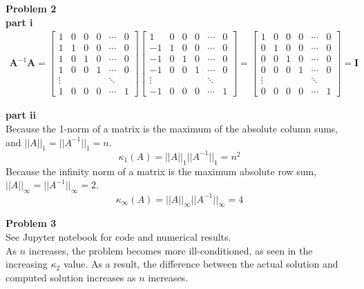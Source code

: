 \documentclass{article} %
\begin{document}
\textbf{Problem 2} \\
\textbf{part i}
\begin{align*}
\boldsymbol{A}^{-1}\boldsymbol{A} = \begin{bmatrix} 
1 & 0 & 0 & 0 & \cdots & 0 \\ 
1 & 1 & 0 & 0 & \cdots & 0 \\
1 & 0 & 1 & 0 & \cdots & 0 \\
1 & 0 & 0 & 1 & \cdots & 0 \\
\vdots &  & &  & \ddots &   \\ 
1 & 0 & 0 & 0 & \cdots & 1 
 \end{bmatrix}
\begin{bmatrix} 
1 & 0 & 0 & 0 & \cdots & 0 \\ 
-1 & 1 & 0 & 0 & \cdots & 0 \\
-1 & 0 & 1 & 0 & \cdots & 0 \\
-1 & 0 & 0 & 1 & \cdots & 0 \\
\vdots &  & &  & \ddots &   \\ 
-1 & 0 & 0 & 0 & \cdots & 1 
 \end{bmatrix}
 =
\begin{bmatrix} 
1 & 0 & 0 & 0 & \cdots & 0 \\ 
0 & 1 & 0 & 0 & \cdots & 0 \\
0 & 0 & 1 & 0 & \cdots & 0 \\
0 & 0 & 0 & 1 & \cdots & 0 \\
\vdots &  & &  & \ddots &   \\ 
0 & 0 & 0 & 0 & \cdots & 1 
 \end{bmatrix}
= \boldsymbol{I}
\end{align*}

\textbf{part ii} \\
Because the 1-norm of a matrix is the maximum of the absolute column sums, and $||A||_1 = ||A^{-1}||_1 = n$.
\begin{equation*}
\kappa_1(A) = ||A||_1 ||A^{-1}||_1 = n^2
\end{equation*}
Because the infinity norm of a matrix is the maximum absolute row sum, $||A||_{\infty} = ||A^{-1}||_{\infty} = 2$.
\begin{equation*}
\kappa_{\infty}(A) = ||A||_{\infty} ||A^{-1}||_{\infty} = 4
\end{equation*}


\textbf{Problem 3} \\
See Jupyter notebook for code and numerical results. \\
As $n$ increases, the problem becomes more ill-conditioned, as seen in the increasing $\kappa_2$ value.  As a result, the difference between the actual solution and computed solution increases as $n$ increases.
\\
\end{document}
